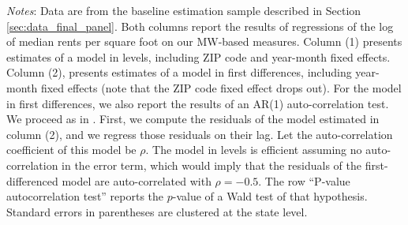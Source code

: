 \begin{table}[hbt!]
    \begin{minipage}{.95\textwidth} \footnotesize
        \vspace{2mm}
        \textit{Notes}: 
        Data are from the baseline estimation sample described in Section 
        \ref{sec:data_final_panel}.
        Both columns report the results of regressions of the log of 
        median rents per square foot on our MW-based measures.
        Column (1) presents estimates of a model in levels, including 
        ZIP code and year-month fixed effects.
        Column (2), presents estimates of a model in first differences, 
        including year-month fixed effects 
        (note that the ZIP code fixed effect drops out).
        For the model in first differences, we also report the results of an 
        AR(1) auto-correlation test.
        We proceed as in \textcite[][Section 10.6.3]{wooldridge2010}.
        First, we compute the residuals of the model estimated in column (2), 
        and we regress those residuals on their lag.
        Let the auto-correlation coefficient of this model be $\rho$.
        The model in levels is efficient assuming no auto-correlation in the 
        error term, which would imply that the residuals of the 
        first-differenced model are auto-correlated with $\rho = -0.5$.
        The row ``P-value autocorrelation test'' reports the $p$-value of 
        a Wald test of that hypothesis.
        Standard errors in parentheses are clustered at the state level.
    \end{minipage}
\end{table}
